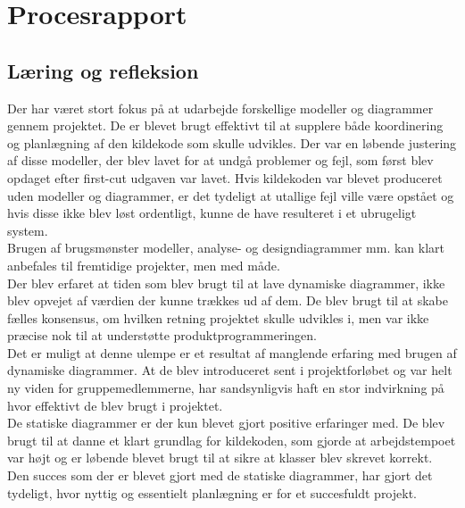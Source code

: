 \chapter{Procesrapport}

\section{Læring og refleksion}
Der har været stort fokus på at udarbejde forskellige modeller og diagrammer gennem projektet. De er blevet brugt effektivt til at supplere både koordinering og planlægning af den kildekode som skulle udvikles. Der var en løbende justering af disse modeller, der blev lavet for at undgå problemer og fejl, som først blev opdaget efter first-cut udgaven var lavet. Hvis kildekoden var blevet produceret uden modeller og diagrammer, er det tydeligt at utallige fejl ville være opstået og hvis disse ikke blev løst ordentligt, kunne de have resulteret i et ubrugeligt system.\\
Brugen af brugsmønster modeller, analyse- og designdiagrammer mm. kan klart anbefales til fremtidige projekter, men med måde.\\
Der blev erfaret at tiden som blev brugt til at lave dynamiske diagrammer, ikke blev opvejet af værdien der kunne trækkes ud af dem. De blev brugt til at skabe fælles konsensus, om hvilken retning projektet skulle udvikles i, men var ikke præcise nok til at understøtte produktprogrammeringen.\\
Det er muligt at denne ulempe er et resultat af manglende erfaring med brugen af dynamiske diagrammer. At de blev introduceret sent i projektforløbet og var helt ny viden for gruppemedlemmerne, har sandsynligvis haft en stor indvirkning på hvor effektivt de blev brugt i projektet.\\
De statiske diagrammer er der kun blevet gjort positive erfaringer med. De blev brugt til at danne et klart grundlag for kildekoden, som gjorde at arbejdstempoet var højt og er løbende blevet brugt til at sikre at klasser blev skrevet korrekt. Den succes som der er blevet gjort med de statiske diagrammer, har gjort det tydeligt, hvor nyttig og essentielt planlægning er for et succesfuldt projekt.  
\newpage
